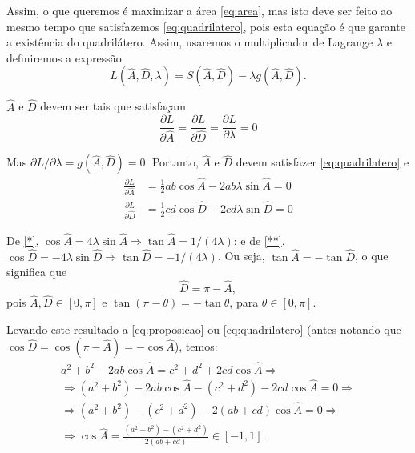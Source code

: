 \documentclass[a4paper,12pt]{scrartcl}
\begin{document}
  Assim, o que queremos é maximizar a área \ref{eq:area}, mas isto deve ser feito ao mesmo tempo que satisfazemos \ref{eq:quadrilatero}, pois esta equação é que garante a existência do quadrilátero. Assim, usaremos o multiplicador de Lagrange $\lambda$ e definiremos a expressão
  \begin{equation*}
   L(\hat A, \hat D, \lambda) = S(\hat A, \hat D) - \lambda g(\hat A, \hat D).
  \end{equation*}
  
  $\hat A$ e $\hat D$ devem ser tais que satisfaçam
  \begin{equation*}
   \frac{\partial L}{\partial \hat A} = \frac{\partial L}{\partial \hat D} = \frac{\partial L}{\partial \lambda} = 0
  \end{equation*}
  
  Mas $\partial L/\partial\lambda = g(\hat A, \hat D) = 0$. Portanto, $\hat A$ e $\hat D$ devem satisfazer \ref{eq:quadrilatero} e
  \begin{align}
   \frac{\partial L}{\partial\hat A} &= \frac{1}{2}ab\cos\hat A - 2ab\lambda\sin\hat A = 0 \label{*}\\
   \frac{\partial L}{\partial\hat D} &= \frac{1}{2}cd\cos\hat D - 2cd\lambda\sin\hat D = 0 \label{**}
  \end{align}
  
  De \eqref{*}, $\cos\hat A = 4\lambda\sin\hat A \Rightarrow \tan\hat A = 1/(4\lambda)$; e de \eqref{**}, $\cos\hat D = -4\lambda\sin\hat D \Rightarrow \tan\hat D = -1/(4\lambda)$. Ou seja, $\tan\hat A = -\tan\hat D$, o que significa que
  \begin{equation}\label{eq:D}
   \hat D = \pi - \hat A,
  \end{equation}
  pois $\hat A, \hat D \in [0,\pi]$ e $\tan(\pi - \theta) = -\tan\theta$, para $\theta\in[0,\pi]$.
  
  Levando este resultado a \eqref{eq:proposicao} ou \eqref{eq:quadrilatero} (antes notando que $\cos\hat D = \cos\left(\pi - \hat A\right) = -\cos\hat A$), temos:
  \begin{gather}
   a^2 + b^2 - 2ab\cos\hat A = c^2 + d^2 + 2cd\cos\hat A \Rightarrow\nonumber\\
   \Rightarrow (a^2 + b^2) - 2ab\cos\hat A - (c^2 + d^2) - 2cd\cos\hat A = 0 \Rightarrow\nonumber \\
   \Rightarrow (a^2 + b^2) - (c^2 + d^2) - 2(ab+cd)\cos\hat A = 0 \Rightarrow\nonumber \\
   \Rightarrow \cos\hat A = \frac{(a^2+b^2)-(c^2+d^2)}{2(ab+cd)} \in [-1,1].\label{eq:A}
  \end{gather}
\end{document}
